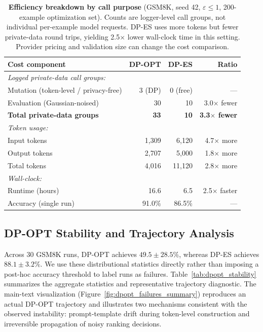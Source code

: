 \begin{table}[t]
\centering
\small
\setlength{\tabcolsep}{4pt}
\begin{tabular}{lrrr}
\toprule
\textbf{Cost component} & \textbf{DP-OPT} & \textbf{DP-ES} & \textbf{Ratio} \\
\midrule
\multicolumn{4}{l}{\textit{Logged private-data call groups:}} \\
\quad Mutation (token-level / privacy-free) & 3 (DP) & 0 (free) & --- \\
\quad Evaluation (Gaussian-noised) & 30 & 10 & 3.0$\times$ fewer \\
\quad \textbf{Total private-data groups} & \textbf{33} & \textbf{10} & \textbf{3.3$\times$ fewer} \\
\midrule
\multicolumn{4}{l}{\textit{Token usage:}} \\
\quad Input tokens & 1{,}309 & 6{,}120 & 4.7$\times$ more \\
\quad Output tokens & 2{,}707 & 5{,}000 & 1.8$\times$ more \\
\quad Total tokens & 4{,}016 & 11{,}120 & 2.8$\times$ more \\
\midrule
\multicolumn{4}{l}{\textit{Wall-clock:}} \\
\quad Runtime (hours) & 16.6 & 6.5 & 2.5$\times$ faster \\
\quad Accuracy (single run) & 91.0\% & 86.5\% & --- \\
\bottomrule
\end{tabular}
\caption{\textbf{Efficiency breakdown by call purpose} (GSM8K, seed 42, $\varepsilon\leq1$, 200-example optimization set). Counts are logger-level call groups, not individual per-example model requests. DP-ES uses more tokens but fewer private-data round trips, yielding 2.5$\times$ lower wall-clock time in this setting. Provider pricing and validation size can change the cost comparison.}
\label{tab:efficiency_breakdown}
\end{table}

\subsection{DP-OPT Stability and Trajectory Analysis}
\label{sec:appendix:dpopt_failures}

\noindent Across 30 GSM8K runs, DP-OPT achieves $49.5{\pm}28.5\%$, whereas DP-ES achieves $88.1{\pm}3.2\%$. We use these distributional statistics directly rather than imposing a post-hoc accuracy threshold to label runs as failures. Table~\ref{tab:dpopt_stability} summarizes the aggregate statistics and representative trajectory diagnostic. The main-text visualization (Figure~\ref{fig:dpopt_failures_summary}) reproduces an actual DP-OPT trajectory and illustrates two mechanisms consistent with the observed instability: prompt-template drift during token-level construction and irreversible propagation of noisy ranking decisions.

